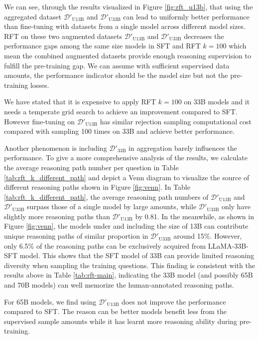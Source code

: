 We can see, through the results visualized in Figure \ref{fig:rft_u13b}, that using the aggregated dataset $\mathcal{D}'_{\text{U13B}}$ and $\mathcal{D}'_{\text{U33B}}$ can lead to uniformly better performance than fine-tuning with datasets from a single model across different model sizes. RFT on these two augmented datasets $\mathcal{D}'_{\text{U13B}}$ and $\mathcal{D}'_{\text{U33B}}$ decreases the performance gaps among the same size models in SFT and RFT $k=100$ which mean the combined augmented datasets provide enough reasoning supervision to fulfill the pre-training gap. We can assume with sufficient supervised data amounts, the performance indicator should be the model size but not the pre-training losses. 

We have stated that it is expensive to apply RFT $k=100$ on 33B models and it needs a temperate grid search to achieve an improvement compared to SFT. However fine-tuning on $\mathcal{D}'_{\text{U13B}}$ has similar rejection sampling computational cost compared with sampling 100 times on 33B and achieve better performance.

Another phenomenon is including $\mathcal{D}'_{\text{33B}}$ in aggregation barely influences the performance. To give a more comprehensive analysis of the results, we calculate the average reasoning path number per question in Table \ref{tab:rft_k_different_path} and depict a Venn diagram to visualize the source of different reasoning paths shown in Figure \ref{fig:venn}. 
In Table \ref{tab:rft_k_different_path}, the average reasoning path numbers of $\mathcal{D}'_{\text{U13B}}$ and $\mathcal{D}'_{\text{U33B}}$ surpass those of a single model by large amounts, while $\mathcal{D}'_{\text{U33B}}$ only have slightly more reasoning paths than $\mathcal{D}'_{\text{U13B}}$ by 0.81. In the meanwhile, as shown in Figure \ref{fig:venn}, the models under and including the size of 13B can contribute unique reasoning paths of similar proportion in $\mathcal{D}'_{\text{U33B}}$ around 15\%. However, only 6.5\% of the reasoning paths can be exclusively acquired from LLaMA-33B-SFT model. This shows that the SFT model of 33B can provide limited reasoning diversity when sampling the training questions. This finding is consistent with the results above in Table \ref{tab:rft-main}, indicating the 33B model (and possibly 65B and 70B models) can well memorize the human-annotated reasoning paths.

For 65B models, we find using $\mathcal{D}'_{\text{U13B}}$ does not improve the performance compared to SFT. The reason can be better models benefit less from the supervised sample amounts while it has learnt more reasoning ability during pre-training.

